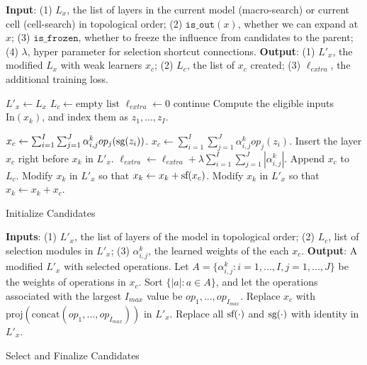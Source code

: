 \begin{algorithm}[t]
\begin{algorithmic}[1]
\STATE \textbf{Input}: 
(1) $L_x$, the list of layers in the current model (macro-search) or current cell (cell-search) in topological order;
(2) $\texttt{is\_out}(x)$, whether we can expand at $x$;
(3) $\texttt{is\_frozen}$, whether to freeze the influence from candidates to the parent;
(4) $\lambda$, hyper parameter for selection shortcut connections. 
\STATE \textbf{Output}: (1) $L'_x$, the modified $L_x$ with weak learners $x_c$; 
(2) $L_c$, the list of $x_c$ created;
(3) $\ell_{extra}$, the additional training loss.

\STATE $L'_x \leftarrow L_x$
\STATE $L_c \leftarrow \text{empty list}$
\STATE $\ell_{extra} \leftarrow 0$ 
        \STATE continue
    \ENDIF
    \STATE Compute the eligible inputs $\text{In}(x_{k})$, and index them as $z_1,...,z_I$.

        \STATE $x_c \leftarrow \sum _{i=1}^I \sum _{j=1}^J  \alpha^k_{i,j}op_j(\textrm{sg} (z_i))$.
        \label{algline:add_sg}
    \ELSE
        \STATE $x_c \leftarrow \sum _{i=1}^I \sum _{j=1}^J  \alpha^k_{i,j}op_j(z_i)$.
    \ENDIF
\STATE Insert the layer $x_c$ right before $x_{k}$ in $L'_x$.
\STATE $\ell_{extra} \leftarrow \ell_{extra} + \lambda \sum _{i=1}^I \sum _{j=1}^J |\alpha^k_{i,j}|$.
\STATE Append $x_c$ to $L_c$.
    \STATE Modify $x_{k}$ in $L'_x$ so that $x_{k} \leftarrow x_{k} + \textrm{sf} (x_c)$.
    \label{algline:add_sf}
\ELSE
    \STATE Modify $x_{k}$ in $L'_x$ so that $x_{k} \leftarrow x_{k} + x_c$.
\ENDIF
\ENDFOR
\end{algorithmic}
\caption{Initialize Candidates}
\label{alg:candidate_init}
\end{algorithm}

\begin{algorithm}[t]
\begin{algorithmic}[1]
\STATE \textbf{Inputs}: (1) $L'_x$, the list of layers of the model in topological order;
(2) $L_c$, list of selection modules in $L'_x$;
(3) $\alpha^k_{i,j}$, the learned weights of the each $x_c$. 
\STATE \textbf{Output}: A modified $L'_x$ with selected operations.
    \STATE Let $A = \{\alpha^{k}_{i,j}: i = 1,..., I, j = 1,..., J\}$  be the weights of operations in $x_c$.
    \STATE Sort $\{ |a| : a \in A \}$, and let the operations associated with the largest $I_{max}$ value be $op_1, ..., op_{I_{max}}$.
    \STATE Replace $x_c$ with $\text{proj}(\text{concat}(op_1, ..., op_{I_{max}}))$ in $L'_x$.
\ENDFOR
\STATE Replace all $\textrm{sf} (\cdot)$ and $\textrm{sg} (\cdot)$ with identity in $L'_x$.
\end{algorithmic}
\caption{Select and Finalize Candidates}
\label{alg:candidate_select}
\end{algorithm}


